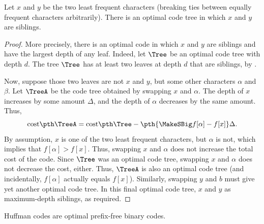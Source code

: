 \begin{lemma}
    Let $x$ and $y$ be the two least frequent characters (breaking
    ties between equally frequent characters arbitrarily). There is an
    optimal code tree in which $x$ and $y$ are siblings.
\end{lemma}

\begin{proof}
    More precisely, there is an optimal code in which $x$ and $y$ are
    siblings and have the largest depth of any leaf.  Indeed, let
    $\Tree$ be an optimal code tree with depth $d$. The tree $\Tree$
    has at least two leaves at depth $d$ that are siblings, by
    .

    Now, suppose those two leaves are not $x$ and $y$, but some other
    characters $\alpha$ and $\beta$.  Let $\TreeA$ be the code tree
    obtained by swapping $x$ and $\alpha$. The depth of $x$ increases
    by some amount $\Delta$, and the depth of $\alpha$ decreases by
    the same amount. Thus,
    \begin{equation*}
    \costX{\TreeA} = \costX{\Tree} - \pth{\MakeSBig f[\alpha ] - f[ x
       ]}\Delta.
    \end{equation*}
    By assumption, $x$ is one of the two least frequent characters,
    but $\alpha$ is not, which implies that $f[\alpha] > f[x]$. Thus,
    swapping $x$ and $\alpha$ does not increase the total cost of the
    code. Since $\Tree$ was an optimal code tree, swapping $x$ and
    $\alpha$ does not decrease the cost, either. Thus, $\TreeA$ is
    also an optimal code tree (and incidentally, $f[\alpha]$ actually
    equals $f[x]$).  Similarly, swapping $y$ and $b$ must give yet another
    optimal code tree. In this final optimal code tree, $x$ and $y$ as
    maximum-depth siblings, as required.
\end{proof}

\begin{theorem}
    Huffman codes are optimal prefix-free binary codes.
\end{theorem}

